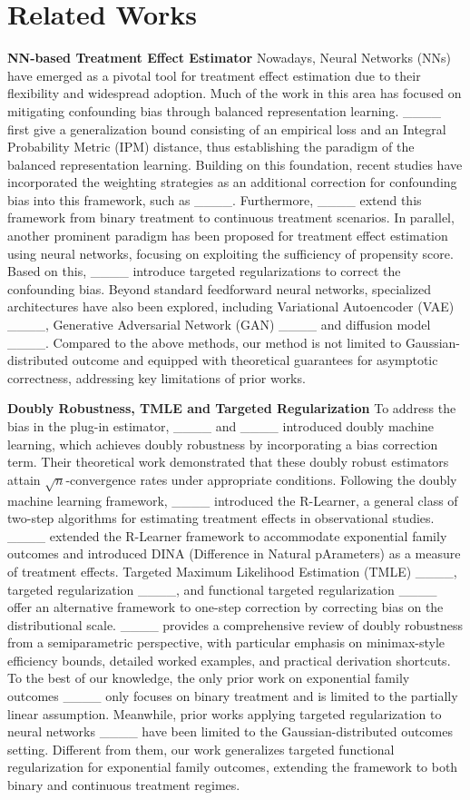 \section{Related Works}
\textbf{NN-based Treatment Effect Estimator}
Nowadays, 
Neural Networks (NNs) have emerged as a pivotal tool for treatment effect estimation due to their flexibility and widespread adoption.
Much of the work in this area has focused on mitigating confounding bias through balanced representation learning.
____ first give a generalization bound consisting of an empirical loss and an Integral Probability Metric (IPM) distance,
thus establishing the paradigm of the balanced representation learning.
Building on this foundation, 
recent studies have incorporated the weighting strategies as an additional correction for confounding bias into this framework, 
such as ____.
Furthermore,
____ extend this framework from binary treatment to continuous treatment scenarios.
In parallel, 
another prominent paradigm has been proposed for treatment effect estimation using neural networks, focusing on exploiting the sufficiency of propensity score.
Based on this,
____ introduce targeted regularizations to correct the confounding bias.
Beyond standard feedforward neural networks, specialized architectures have also been explored,
including Variational Autoencoder (VAE) ____, 
Generative Adversarial Network (GAN) ____ and diffusion model ____.
Compared to the above methods, 
our method is not limited to Gaussian-distributed outcome and equipped with theoretical guarantees for asymptotic correctness, 
addressing key limitations of prior works.

\textbf{Doubly Robustness, TMLE and Targeted Regularization} To address the bias in the plug-in estimator, ____ and ____ introduced doubly machine learning, which achieves doubly robustness by incorporating a bias correction term. Their theoretical work demonstrated that these doubly robust estimators attain $\sqrt{n}$-convergence rates under appropriate conditions. 
Following the doubly machine learning framework, ____ introduced the R-Learner, a general class of two-step algorithms for estimating treatment effects in observational studies. ____ extended the R-Learner framework to accommodate exponential family outcomes and introduced DINA (Difference in Natural pArameters) as a measure of treatment effects. Targeted Maximum Likelihood Estimation (TMLE) ____, targeted regularization ____, and functional targeted regularization ____ offer an alternative framework to one-step correction by correcting bias on the distributional scale. 
____ provides a comprehensive review of doubly robustness from a semiparametric perspective, with particular emphasis on minimax-style efficiency bounds, detailed worked examples, and practical derivation shortcuts. 
To the best of our knowledge, 
the only prior work on exponential family outcomes ____ only focuses on binary treatment and is limited to the partially linear assumption. 
Meanwhile,
prior works applying targeted regularization to neural networks ____ have been limited to the Gaussian-distributed outcomes setting. 
Different from them,
our work generalizes targeted functional regularization for exponential family outcomes, extending the framework to both binary and continuous treatment regimes.